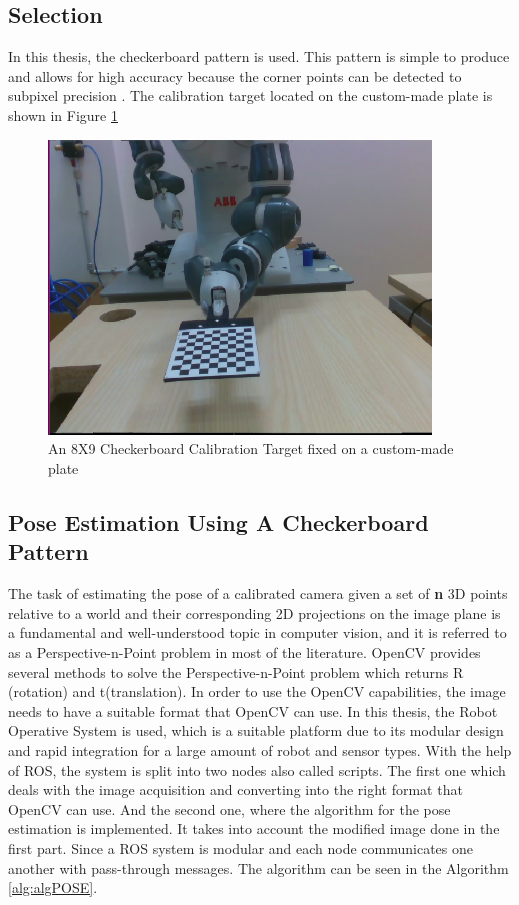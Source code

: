 \subsection{Selection}
In this thesis, the checkerboard pattern is used.  This pattern is simple to produce and allows for high accuracy because the corner points can be detected to subpixel precision \cite{planarTargets}. The calibration target located on the custom-made plate is shown in Figure \ref{fig:target2}


\begin{figure}[!h]
\begin{center}
\includegraphics[width=4in]{figures03/target1.png}
\caption{An 8X9 Checkerboard Calibration Target fixed on a custom-made plate}
\label{fig:target2}
\end{center}
\end{figure}

\subsection{Pose Estimation Using A Checkerboard Pattern}\label{pose1}

The task of estimating the pose of a calibrated camera given a set of \textbf{n} 3D points relative to a world and their corresponding 2D projections on the image plane is a fundamental and well-understood topic in computer vision, and it is referred to as a Perspective-n-Point problem in most of the literature. OpenCV provides several methods to solve the Perspective-n-Point problem which returns R (rotation) and t(translation). In order to use the OpenCV capabilities, the image needs to have a suitable format that OpenCV can use. In this thesis, the Robot Operative System is used, which is a suitable platform due to its modular design and rapid integration for a large amount of robot and sensor types.
With the help of ROS, the system is split into two nodes also called scripts. The first one which deals with the image acquisition and converting into the right format that OpenCV can use. And the second one, where the algorithm for the pose estimation is implemented. It takes into account the modified image done in the first part. 
Since a ROS system is modular and each node communicates one another with pass-through messages. The algorithm can be seen in the Algorithm \ref{alg:algPOSE}.

